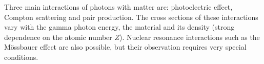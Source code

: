 \par
Three main interactions of photons with matter are: photoelectric effect, Compton scattering and pair production. The cross sections of these interactions vary with the gamma photon energy, the material and its density (strong dependence on the atomic number $Z$). Nuclear resonance interactions such as the Mössbauer effect are also possible, but their observation requires very special conditions.


